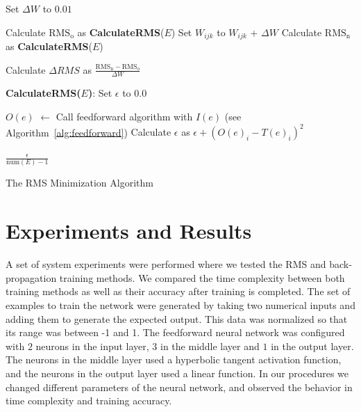 \documentclass[11pt]{article}
\begin{document}
\begin{algorithm}%
\dontprintsemicolon
{}
Set $\Delta W$ to $0.01$\;
\SetLine
{}
{
	{
		{
				{
					Calculate $\mbox{RMS}_{\mbox{o}}$ as \textbf{CalculateRMS}($E$)\;
					Set $W_{ijk}$ to $W_{ijk}$ + $\Delta W$\;
					Calculate $\mbox{RMS}_{\mbox{n}}$ as \textbf{CalculateRMS}($E$)\;
				
					Calculate $\Delta RMS$ as $ \frac{\mbox{RMS}_{\mbox{n}}-\mbox{RMS}_{\mbox{o}}}{\Delta W} $\;
				
				}
		}
	}
}

\textbf{CalculateRMS($E$)}:
\dontprintsemicolon
{} 
Set $\epsilon$ to $0.0$\;
{
	$O(e)$ $\leftarrow$  Call feedforward algorithm with $I(e)$ (see Algorithm~\ref{alg:feedforward})\;
	{
		Calculate $\epsilon$ as $\epsilon + (O(e)_{i} - T(e)_{i})^{2}$\;
	} 
	
}
\Return $\frac{\epsilon}{\mbox{num}(E) - 1}$ 
\vspace{5mm}
\caption{The RMS Minimization Algorithm}
\label{alg:RMSminimization}
\end{algorithm}




\section{Experiments and Results} %
\label{sec:results}

A set of system experiments were performed where we tested the RMS and back-propagation training methods. We compared the time
complexity between both training methods as well as their accuracy after training is completed. The set of examples to train
the network were generated by taking two numerical inputs and adding them to generate the expected output. This data was
normalized so that its range was between -1 and 1. The feedforward neural network was configured with $2$ neurons in the input
layer, $3$ in the middle layer and $1$ in the output layer. The neurons in the middle layer used a hyperbolic tangent
activation function, and the neurons in the output layer used a linear function. In our procedures we changed different
parameters of the neural network, and observed the behavior in time complexity and training accuracy.
\end{document}

